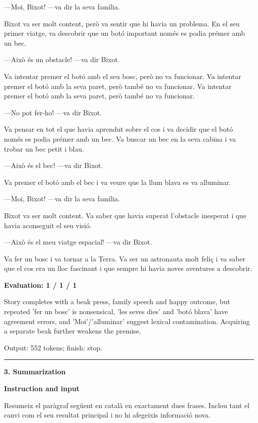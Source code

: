\documentclass[10pt]{article}
\begin{document}
{\begin{minipage}{\textwidth}
\par\smallskip
—Moi, Bixot! —va dir la seva família.
\par\smallskip
Bixot va ser molt content, però va sentir que hi havia un problema. En el seu primer viatge, va descobrir que un botó important només es podia prémer amb un bec.
\par\smallskip
—Això és un obstacle! —va dir Bixot.
\par\smallskip
Va intentar premer el botó amb el seu bosc, però no va funcionar. Va intentar premer el botó amb la seva paret, però també no va funcionar. Va intentar premer el botó amb la seva paret, però també no va funcionar.
\par\smallskip
—No pot fer-ho! —va dir Bixot.
\par\smallskip
Va pensar en tot el que havia aprendut sobre el cos i va decidir que el botó només es podia prémer amb un bec. Va buscar un bec en la seva cabina i va trobar un bec petit i blau.
\par\smallskip
—Això és el bec! —va dir Bixot.
\par\smallskip
Va premer el botó amb el bec i va veure que la llum blava es va alluminar.
\par\smallskip
—Moi, Bixot! —va dir la seva família.
\par\smallskip
Bixot va ser molt content. Va saber que havia superat l'obstacle inesperat i que havia aconseguit el seu visió.
\par\smallskip
—Això és el meu viatge espacial! —va dir Bixot.
\par\smallskip
Va fer un bosc i va tornar a la Terra. Va ser un astronauta molt feliç i va saber que el cos era un lloc fascinant i que sempre hi havia noves aventures a descobrir.\par\smallskip
\textbf{Evaluation: 1 / 1 / 1}\par Story completes with a beak press, family speech and happy outcome, but repeated 'fer un bosc' is nonsensical, 'les seves dies' and 'botó blava' have agreement errors, and 'Moi'/'alluminar' suggest lexical contamination. Acquiring a separate beak further weakens the premise.
\par {\color{gray} Output: 552 tokens; finish: stop.}\par
\medskip\hrule\smallskip
{\bfseries 3. Summarization}\par\smallskip
\textbf{Instruction and input}\par Resumeix el paràgraf següent en català en exactament dues frases. Inclou tant el canvi com el seu resultat principal i no hi afegeixis informació nova.

\end{minipage}}
\end{document}
